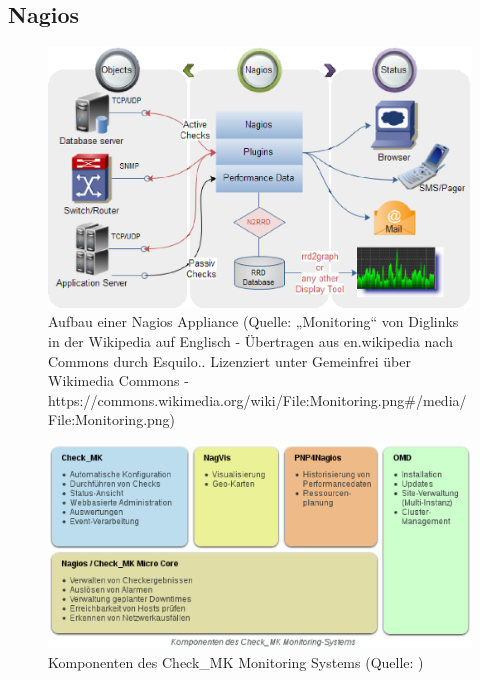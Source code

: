 \documentclass[12pt,a4paper,parskip]{scrreprt}
\begin{document}
	\subsection{Nagios}
	\begin{figure}
	\centering
	\includegraphics[width=1\textwidth]{pics/NagiosMonitoring.eps}
    \caption[Grober Aufbau von Nagios]{Aufbau einer Nagios Appliance (Quelle: „Monitoring“ von Diglinks in der Wikipedia auf Englisch - Übertragen aus en.wikipedia nach Commons durch Esquilo.. Lizenziert unter Gemeinfrei über Wikimedia Commons - https://commons.wikimedia.org/wiki/File:Monitoring.png\#/media/File:Monitoring.png)}
	\end{figure}
	\begin{figure}
		\centering
		\includegraphics[width=1\textwidth]{pics/checkMKAufbau.eps}
		\caption[Komponenten des Check\_MK Monitoring Systems]{Komponenten des Check\_MK Monitoring Systems (Quelle: \cite{checkmkmonitoringpic})}
	\end{figure}
\end{document}
